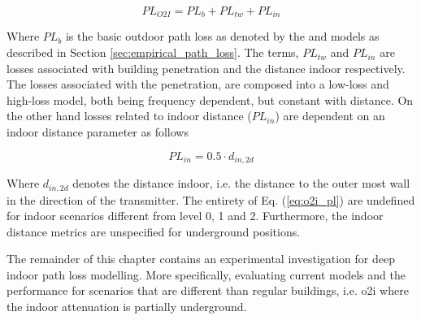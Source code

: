\begin{equation}\label{eq:o2i_pl}
    PL_{O2I} = PL_{b} + PL_{tw} + PL_{in}
\end{equation}

Where $PL_{b}$ is the basic outdoor path loss as denoted by the  and  models as described in Section \ref{sec:empirical_path_loss}. The terms, $PL_{tw}$ and $PL_{in}$ are losses associated with building penetration and the distance indoor respectively. The losses associated with the penetration, are composed into a low-loss and high-loss model, both being frequency dependent, but constant with distance.  On the other hand losses related to indoor distance ($PL_{in}$) are dependent on an indoor distance parameter as follows

\begin{equation}\label{eq:o2i_pl_in}
    PL_{in} = 0.5 \cdot d_{in,2d}
\end{equation}

Where $d_{in,2d}$ denotes the distance indoor, i.e. the distance to the outer most wall in the direction of the transmitter. The entirety of Eq. (\ref{eq:o2i_pl}) are undefined for indoor scenarios different from level 0, 1 and 2. Furthermore, the indoor distance metrics are unspecified for underground positions. 

The remainder of this chapter contains an experimental investigation for deep indoor path loss modelling. More specifically, evaluating current models and the performance for scenarios that are different than regular buildings, i.e. \gls{o2i} where the indoor attenuation is partially underground. 


